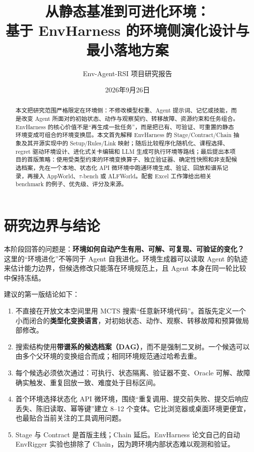 \documentclass[11pt,a4paper,fontset=fandol]{ctexart}
\title{从静态基准到可进化环境：\\基于 EnvHarness 的环境侧演化设计与最小落地方案}
\author{Env-Agent-RSI 项目研究报告}
\date{2026年9月26日}
\begin{document}
\maketitle

\begin{abstract}
本文把研究范围严格限定在环境侧：不修改模型权重、Agent 提示词、记忆或技能，而是改变 Agent 所面对的初始状态、动作与观察契约、转移故障、资源约束和任务组合。EnvHarness 的核心价值不是“再生成一批任务”，而是把已有、可验证、可重置的静态环境变成可组合的环境变换层。本文首先解释 EnvHarness 的 Stage/Contract/Chain 抽象及其开源实现中的 Setup/Rules/Link 映射；随后比较程序化随机化、课程选择、regret 驱动环境设计、进化式关卡编辑和 LLM 生成可执行环境等路线；最后提出本项目的首版策略：使用受类型约束的环境变换算子、独立验证器、确定性快照和非支配候选档案，先在一个本地、状态化 API 微环境中跑通环境生成、验证、回放和谱系记录，再接入 AppWorld、$\tau$-bench 或 ALFWorld。配套 Excel 工作簿给出相关 benchmark 的例子、优先级、评分及来源。
\end{abstract}

\section{研究边界与结论}

本阶段回答的问题是：\textbf{环境如何自动产生有用、可解、可复现、可验证的变化？} 这里的“环境进化”不等同于 Agent 自我进化。环境生成器可以读取 Agent 的轨迹来估计能力边界，但候选修改只能落在环境规范上，且 Agent 本身在同一轮比较中保持冻结。

建议的第一版结论如下：

\begin{enumerate}
  \item 不直接在开放文本空间里用 MCTS 搜索“任意新环境代码”。首版先定义一个小而闭合的\textbf{类型化变换语言}，对初始状态、动作、观察、转移故障和预算做局部修改。
  \item 搜索结构使用\textbf{带谱系的候选档案（DAG）}，而不是强制二叉树。一个候选可以由多个父环境的变换组合而成；相同环境规范通过哈希去重。
  \item 每个候选必须依次通过：可执行、状态隔离、验证器不变、Oracle 可解、故障确实触发、重复回放一致、难度处于目标区间。
  \item 首个环境选择状态化 API 微环境，围绕“重复调用、提交前失败、提交后响应丢失、陈旧读取、幂等键”建立 8--12 个变体。它比浏览器或桌面环境更便宜，也最贴合当前关注的工具调用问题。
  \item Stage 与 Contract 是首版主线；Chain 延后。EnvHarness 论文自己的自动 EnvRigger 实验也排除了 Chain，因为跨环境内部状态难以观测和验证\cite{envharness}。
\end{enumerate}
\end{document}

